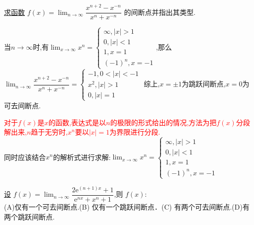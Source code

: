 \documentclass[8pt a4paper, oneside, UTF8]{ctexbook}
\begin{document}
\begin{sloppypar}
\begin{solution}
    \end{solution}
    \begin{problem}
        \uline{求函数} $f(x)=\lim_{n\to\infty}\dfrac{x^{n+2}-x^{-n}}{x^n+x^{-n}}$ 的间断点并指出其类型.
    \end{problem}
    \begin{solution}
        当$n \to \infty$时,有$\lim_{x \to \infty}x^n=\begin{cases}
            \infty ,|x|>1\\ 
            0,|x|<1\\1,
            x=1\\
            (-1)^n,x=-1
        \end{cases}$,那么$\lim_{n\to\infty}\dfrac{x^{n+2}-x^{-n}}{x^n+x^{-n}}=
        \begin{cases} 
            -1,0<|x|<-1\\x^2,|x|>1\\0,|x|=1
        \end{cases}$
    综上,$x= \pm 1$为跳跃间断点,$x=0$为可去间断点.
    \end{solution}
    \begin{note}
        \textcolor{red}{对于$f(x)$是$x$的函数,表达式是以$n$的极限的形式给出的情况,方法为把$f(x)$分段解出来,$n$趋于无穷时,$x^n$要以$|x|=1$为界限进行分段.}\\同时应该结合$x^n$的解析式进行求解:$\lim_{x \to \infty}x^n=\begin{cases}
            \infty ,|x|>1\\ 
            0,|x|<1\\1,
            x=1\\
            (-1)^n,x=-1
        \end{cases}$
    \end{note}
    \begin{problem}
        \uline{设} $f(x)=\lim_{n\to\infty}\dfrac{2\mathrm{e}^{(n+1)x}+1}{\mathrm{e}^{nx}+x^{n}+1}$,则 $f(x):$  \\
        (A)仅有一个可去间断点.\quad(B) 仅有一个跳跃间断点．\quad(C) 有两个可去间断点.\quad(D)有两个跳跃间断点.
    \end{problem}
\end{sloppypar}
\end{document}
